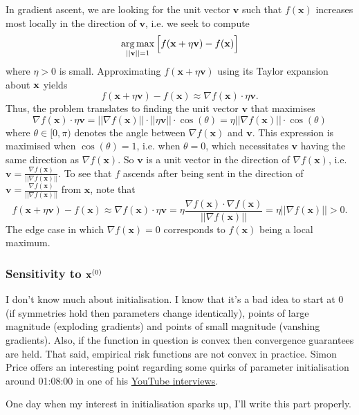 \documentclass[11pt]{article}
\begin{document}
In gradient ascent, we are looking for the unit vector $\mathbf{v}$ such that $f(\mathbf{x})$ increases most locally in the direction of $\mathbf{v}$, i.e. we seek to compute
$$\operatorname*{arg\,max}_{||\mathbf{v}||=1}\Big[f(\mathbf{x}+\eta\mathbf{v})-f(\mathbf{x})\Big]$$
where $\eta>0$ is small. Approximating $f(\mathbf{x}+\eta\mathbf{v})$ using its Taylor expansion about $\mathbf{x}$ yields
$$
f(\mathbf{x}+\eta\mathbf{v})-f(\mathbf{x})
\approx
\nabla f(\mathbf{x})\cdot\eta\mathbf{v}.
$$
Thus, the problem translates to finding the unit vector $\mathbf{v}$ that maximises
$$
\nabla f(\mathbf{x})\cdot\eta\mathbf{v}=||\nabla f(\mathbf{x})||\cdot||\eta\mathbf{v}||\cdot\cos(\theta)=\eta||\nabla f(\mathbf{x})||\cdot\cos(\theta)
$$
where $\theta\in[0,\pi)$ denotes the angle between $\nabla f(\mathbf{x})$ and $\mathbf{v}$. This expression is maximised when $\cos(\theta)=1$, i.e. when $\theta=0$, which necessitates $\mathbf{v}$ having the same direction as $\nabla f(\mathbf{x})$. So $\mathbf{v}$ is a unit vector in the direction of $\nabla f(\mathbf{x})$, i.e. $\mathbf{v}=\frac{\nabla f(\mathbf{x})}{||\nabla f(\mathbf{x})||}$. To see that $f$ ascends after being sent in the direction of $\mathbf{v}=\frac{\nabla f(\mathbf{x})}{||\nabla f(\mathbf{x})||}$ from $\mathbf{x}$, note that
$$
f(\mathbf{x}+\eta\mathbf{v})-f(\mathbf{x})
\approx
\nabla f(\mathbf{x})\cdot\eta\mathbf{v}
=
\eta\frac{\nabla f(\mathbf{x})\cdot\nabla f(\mathbf{x})}{||\nabla f(\mathbf{x})||}
=
\eta||\nabla f(\mathbf{x})||
>
0.
$$
The edge case in which $\nabla f(\mathbf{x})=0$ corresponds to $f(\mathbf{x})$ being a local maximum.

\subsubsection{Sensitivity to $\mathbf{x}^{(0)}$}
I don't know much about initialisation. I know that it's a bad idea to start at 0 (if symmetries hold then parameters change identically), points of large magnitude (exploding gradients) and points of small magnitude (vanshing gradients). Also, if the function in question is convex then convergence guarantees are held. That said, empirical risk functions are not convex in practice. Simon Price offers an interesting point regarding some quirks of parameter initialisation around 01:08:00 in one of his \href{https://www.youtube.com/watch?v=sJXn4Cl4oww&list=PLwFLAA-F1PgpU9lgxOdhjILkMXUagGnea&ab_channel=MachineLearningStreetTalk}{YouTube interviews}.

One day when my interest in initialisation sparks up, I'll write this part properly.
\end{document}
